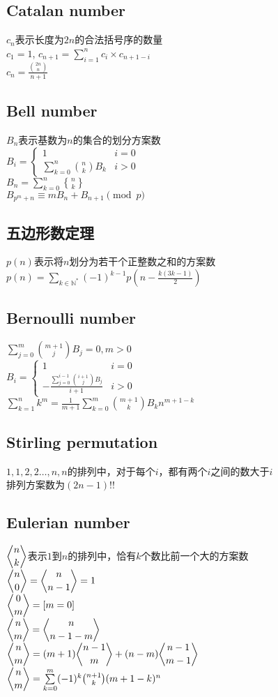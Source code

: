 	\subsection*{Catalan number}
		$ c_n $表示长度为$ 2n $的合法括号序的数量
		\\$ c_1 = 1 $, $ c_{n+1} = \sum\limits_{i=1}^{n} c_i \times c_{n + 1 - i} $
		\\$ c_n = \frac{\binom{2n}{n}}{n + 1} $
	\subsection*{Bell number}
		$ B_n $表示基数为$ n $的集合的划分方案数
		\\$ B_i = \begin{cases}
			1 & i = 0\\
			\sum\limits_{k = 0}^{n} \binom{n}{k} B_k & i > 0
		\end{cases} $
		\\$ B_n = \sum\limits_{k = 0}^{n} {n \brace k} $
		\\$ B_{p^m + n} \equiv m B_n + B_{n + 1} \pmod p $
	\subsection*{五边形数定理}
		$ p(n) $表示将$ n $划分为若干个正整数之和的方案数
		\\$ p(n) = \sum\limits_{k \in \mathbb{N}^\ast} (-1)^{k - 1} p(n - \frac{k(3k - 1)}{2}) $
	\subsection*{Bernoulli number}
		$ \sum\limits_{j = 0}^{m} \binom{m + 1}{j} B_j = 0, m > 0 $
		\\$ B_i = \begin{cases}
			1 & i = 0\\
			-\frac{\sum\limits_{j = 0}^{i - 1} \binom{i + 1}{j} B_j}{i + 1} & i > 0
		\end{cases} $
		\\$ \sum\limits_{k = 1}^{n} k ^ m = \frac{1}{m + 1} \sum\limits_{k = 0}^{m} \binom{m + 1}{k} B_k n ^ {m + 1 - k} $
	\subsection*{Stirling permutation}
		$ 1, 1, 2, 2 \dots , n, n $的排列中，对于每个$ i $，都有两个$ i $之间的数大于$ i $
		\\排列方案数为$ (2n - 1)!! $
	\subsection*{Eulerian number}
		$ \eularian{n}{k} $表示$ 1 $到$ n $的排列中，恰有$ k $个数比前一个大的方案数
		\\$ \eularian{n}{0} = \eularian{n}{n - 1} = 1 $
		\\$ \eularian{0}{m} = [m = 0] $
		\\$ \eularian{n}{m} = \eularian{n}{n - 1 - m} $
		\\$ \eularian{n}{m} = (m + 1) \eularian{n - 1}{m} + (n - m) \eularian{n - 1}{m - 1} $
		\\$ \eularian{n}{m} = \sum\limits_{k = 0}^{m} (-1)^k \binom{n + 1}{k} (m + 1 - k)^n $

